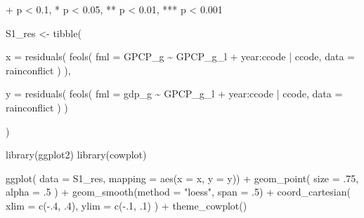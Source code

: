 \documentclass[
  a4paper,
  DIV=11,
  oneside]{scrreprt}
\newenvironment{Shaded}{\begin{snugshade}}{\end{snugshade}}
\newcommand{\AttributeTok}[1]{\textcolor[rgb]{0.40,0.45,0.13}{#1}}
\newcommand{\DecValTok}[1]{\textcolor[rgb]{0.68,0.00,0.00}{#1}}
\newcommand{\FunctionTok}[1]{\textcolor[rgb]{0.28,0.35,0.67}{#1}}
\newcommand{\NormalTok}[1]{\textcolor[rgb]{0.00,0.23,0.31}{#1}}
\newcommand{\OtherTok}[1]{\textcolor[rgb]{0.00,0.23,0.31}{#1}}
\newcommand{\SpecialCharTok}[1]{\textcolor[rgb]{0.37,0.37,0.37}{#1}}
\newcommand{\StringTok}[1]{\textcolor[rgb]{0.13,0.47,0.30}{#1}}
\begin{document}
\begin{minipage}{\linewidth}
+ p < 0.1, * p < 0.05, ** p < 0.01, *** p < 0.001\\
\end{minipage}
\endgroup

\begin{Shaded}
\begin{Highlighting}[]
\NormalTok{S1\_res }\OtherTok{\textless{}{-}} \FunctionTok{tibble}\NormalTok{(}

  \AttributeTok{x =} \FunctionTok{residuals}\NormalTok{(}
    \FunctionTok{feols}\NormalTok{(}
      \AttributeTok{fml =}\NormalTok{ GPCP\_g }\SpecialCharTok{\textasciitilde{}}\NormalTok{ GPCP\_g\_l}
      \SpecialCharTok{+}\NormalTok{ year}\SpecialCharTok{:}\NormalTok{ccode}
      \SpecialCharTok{|}\NormalTok{ ccode,}
      \AttributeTok{data =}\NormalTok{ rainconflict}
\NormalTok{    )}
\NormalTok{  ),}
  
  \AttributeTok{y =} \FunctionTok{residuals}\NormalTok{(}
    \FunctionTok{feols}\NormalTok{(}
      \AttributeTok{fml =}\NormalTok{ gdp\_g }\SpecialCharTok{\textasciitilde{}}\NormalTok{ GPCP\_g\_l}
      \SpecialCharTok{+}\NormalTok{ year}\SpecialCharTok{:}\NormalTok{ccode}
      \SpecialCharTok{|}\NormalTok{ ccode,}
      \AttributeTok{data =}\NormalTok{ rainconflict}
\NormalTok{    )}
\NormalTok{  )}
  
\NormalTok{)}
\end{Highlighting}
\end{Shaded}

\begin{Shaded}
\begin{Highlighting}[]
\FunctionTok{library}\NormalTok{(ggplot2)}
\FunctionTok{library}\NormalTok{(cowplot)}

\FunctionTok{ggplot}\NormalTok{(}
  \AttributeTok{data =}\NormalTok{ S1\_res,}
  \AttributeTok{mapping =} \FunctionTok{aes}\NormalTok{(}\AttributeTok{x =}\NormalTok{ x, }\AttributeTok{y =}\NormalTok{ y)) }\SpecialCharTok{+}
  \FunctionTok{geom\_point}\NormalTok{(}
    \AttributeTok{size =}\NormalTok{ .}\DecValTok{75}\NormalTok{, }
    \AttributeTok{alpha =}\NormalTok{ .}\DecValTok{5}
\NormalTok{  ) }\SpecialCharTok{+}
  \FunctionTok{geom\_smooth}\NormalTok{(}\AttributeTok{method =} \StringTok{"loess"}\NormalTok{, }\AttributeTok{span =}\NormalTok{ .}\DecValTok{5}\NormalTok{) }\SpecialCharTok{+}
  \FunctionTok{coord\_cartesian}\NormalTok{(}
    \AttributeTok{xlim =} \FunctionTok{c}\NormalTok{(}\SpecialCharTok{{-}}\NormalTok{.}\DecValTok{4}\NormalTok{, .}\DecValTok{4}\NormalTok{), }
    \AttributeTok{ylim =} \FunctionTok{c}\NormalTok{(}\SpecialCharTok{{-}}\NormalTok{.}\DecValTok{1}\NormalTok{, .}\DecValTok{1}\NormalTok{)}
\NormalTok{  ) }\SpecialCharTok{+}
  \FunctionTok{theme\_cowplot}\NormalTok{()}
\end{Highlighting}
\end{Shaded}
\end{document}
